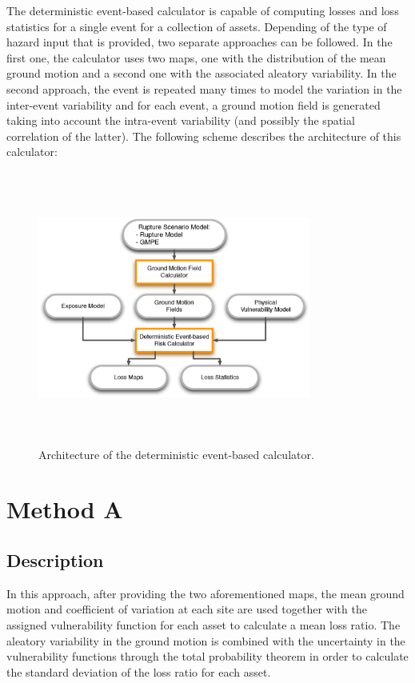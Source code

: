 The deterministic event-based calculator is capable of computing losses and loss statistics for a single event for a collection of assets. Depending of the type of hazard input that is provided, two separate approaches can be followed. In the first one, the calculator uses two maps, one with the distribution of the mean ground motion and a second one with the associated aleatory variability. In the second approach, the event is repeated many times to model the variation in the inter-event variability and for each event, a ground motion field is generated taking into account the intra-event variability (and possibly the spatial correlation of the latter). The following scheme describes the architecture of this calculator:

\begin{figure}[ht]
\centering
\includegraphics[width=9cm,height=9cm]{./Figures/Part_Risk/Scheme_Deter_calc.eps}
\caption{Architecture of the deterministic event-based calculator.}
\label{fig:Scheme_deter_calc}
\end{figure}

\section{Method A} 
\subsection{Description}
In this approach, after providing the two aforementioned maps, the mean ground motion and coefficient of variation at each site are used together with the assigned vulnerability function for each asset  to calculate a mean loss ratio. The aleatory variability in the ground motion is combined with the uncertainty in the vulnerability functions through the total probability theorem in order to calculate the standard deviation of the loss ratio for each asset.


